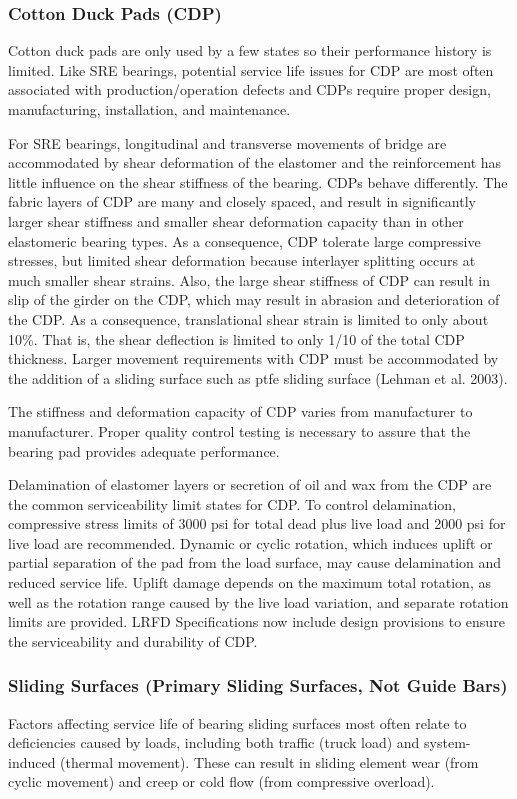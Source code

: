 \subsubsection{Cotton Duck Pads (CDP)}
Cotton duck pads are only used by a few states so their performance history is limited. Like SRE bearings,
potential service life issues for CDP are most often associated with production/operation defects and CDPs require
proper design, manufacturing, installation, and maintenance.

For SRE bearings, longitudinal and transverse movements of bridge are accommodated by shear deformation of
the elastomer and the reinforcement has little influence on the shear stiffness of the bearing. CDPs behave differently.
The fabric layers of CDP are many and closely spaced, and result in significantly larger shear stiffness and smaller
shear deformation capacity than in other elastomeric bearing types. As a consequence, CDP tolerate large
compressive stresses, but limited shear deformation because interlayer splitting occurs at much smaller shear strains.
Also, the large shear stiffness of CDP can result in slip of the girder on the CDP, which may result in abrasion and
deterioration of the CDP. As a consequence, translational shear strain is limited to only about 10\%. That is, the shear
deflection is limited to only 1/10 of the total CDP thickness. Larger movement requirements with CDP must be
accommodated by the addition of a sliding surface such as \acrshort{ptfe} sliding surface (Lehman et al. 2003).

The stiffness and deformation capacity of CDP varies from manufacturer to manufacturer. Proper quality control
testing is necessary to assure that the bearing pad provides adequate performance.

Delamination of elastomer layers or secretion of oil and wax from the CDP are the common serviceability limit
states for CDP. To control delamination, compressive stress limits of 3000 psi for total dead plus live load and 2000
psi for live load are recommended. Dynamic or cyclic rotation, which induces uplift or partial separation of the pad
from the load surface, may cause delamination and reduced service life. Uplift damage depends on the maximum
total rotation, as well as the rotation range caused by the live load variation, and separate rotation limits are provided.
LRFD Specifications now include design provisions to ensure the serviceability and durability of CDP.

\subsubsection{Sliding Surfaces (Primary Sliding Surfaces, Not Guide Bars)}
Factors affecting service life of bearing sliding surfaces most often relate to deficiencies caused by loads,
including both traffic (truck load) and system-induced (thermal movement). These can result in sliding element wear
(from cyclic movement) and creep or cold flow (from compressive overload).

